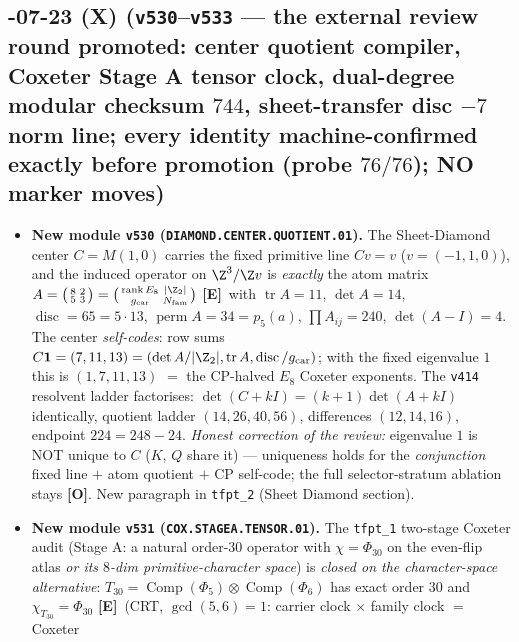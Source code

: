 \documentclass[11pt]{article}
\providecommand{\mE}{\textbf{[E]}}\providecommand{\mC}{\textbf{[C]}}
\providecommand{\mO}{\textbf{[O]}}\providecommand{\mX}{\textbf{[X]}}
\providecommand{\vref}[1]{\texttt{#1}}
\providecommand{\gcar}{g_{\mathrm{car}}}\providecommand{\Nfam}{N_{\mathrm{fam}}}
\begin{document}
\subsection*{-07-23 (X) (\texttt{v530}--\texttt{v533} --- the external review round promoted: center quotient compiler, Coxeter Stage A tensor clock, dual-degree modular checksum $744$, sheet-transfer disc $-7$ norm line; every identity machine-confirmed exactly before promotion (probe $76/76$); NO marker moves)}
\begin{itemize}[leftmargin=1.5em]
\item \textbf{New module \texttt{v530} (\texttt{DIAMOND.CENTER.QUOTIENT.01}).} The Sheet-Diamond center $C=M(1,0)$
carries the fixed primitive line $Cv=v$ ($v=(-1,1,0)$), and the induced operator on $\Z^3/\Z v$ is
\emph{exactly} the atom matrix $A=\big(\begin{smallmatrix}8&2\\5&3\end{smallmatrix}\big)
=\big(\begin{smallmatrix}\operatorname{rank}E_8&|\Z_2|\\ \gcar&\Nfam\end{smallmatrix}\big)$ \mE\ with
$\operatorname{tr}A=11$, $\det A=14$, $\operatorname{disc}=65=5\cdot13$, $\operatorname{perm}A=34=p_5(a)$,
$\prod A_{ij}=240$, $\det(A{-}I)=4$. The center \emph{self-codes}: row sums
$C\mathbf 1=(7,11,13)=(\det A/|\Z_2|,\operatorname{tr}A,\operatorname{disc}/\gcar)$; with the fixed
eigenvalue $1$ this is $(1,7,11,13)$ $=$ the CP-halved $E_8$ Coxeter exponents. The \vref{v414} resolvent
ladder factorises: $\det(C{+}kI)=(k{+}1)\det(A{+}kI)$ identically, quotient ladder $(14,26,40,56)$,
differences $(12,14,16)$, endpoint $224=248-24$. \emph{Honest correction of the review:} eigenvalue $1$ is
NOT unique to $C$ ($K$, $Q$ share it) --- uniqueness holds for the \emph{conjunction} fixed line $+$ atom
quotient $+$ CP self-code; the full selector-stratum ablation stays \mO. New paragraph in
\texttt{tfpt\_2} (Sheet Diamond section).
\item \textbf{New module \texttt{v531} (\texttt{COX.STAGEA.TENSOR.01}).} The \texttt{tfpt\_1} two-stage Coxeter
audit (Stage A: a natural order-$30$ operator with $\chi=\Phi_{30}$ on the even-flip atlas \emph{or its
$8$-dim primitive-character space}) is \emph{closed on the character-space alternative}: $T_{30}=
\operatorname{Comp}(\Phi_5)\otimes\operatorname{Comp}(\Phi_6)$ has exact order $30$ and
$\chi_{T_{30}}=\Phi_{30}$ \mE\ (CRT, $\gcd(5,6)=1$: carrier clock $\times$ family clock $=$ Coxeter

\end{itemize}
\end{document}
